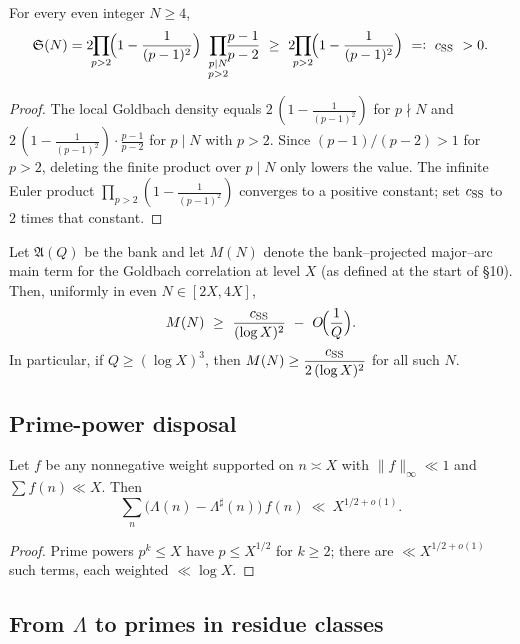 \begin{lemma}\label{lem:SS-positive}
For every even integer $N\ge 4$,
\[
\mathfrak S(N)
=2\!\!\prod_{p>2}\!\!\Big(1-\frac{1}{(p-1)^2}\Big)\ \prod_{\substack{p\mid N\\ p>2}}\!\!\frac{p-1}{p-2}
\ \ge\ 2\!\!\prod_{p>2}\!\!\Big(1-\frac{1}{(p-1)^2}\Big)\ =:\ c_{\rm SS}\ >0.
\]
\end{lemma}

\begin{proof}
The local Goldbach density equals $2\,(1-\tfrac{1}{(p-1)^2})$ for $p\nmid N$ and $2\,(1-\tfrac{1}{(p-1)^2})\cdot \frac{p-1}{p-2}$ for $p\mid N$ with $p>2$. Since $(p-1)/(p-2)>1$ for $p>2$, deleting the finite product over $p\mid N$ only lowers the value. The infinite Euler product $\prod_{p>2}(1-\frac{1}{(p-1)^2})$ converges to a positive constant; set $c_{\rm SS}$ to $2$ times that constant.
\end{proof}

\begin{corollary}\label{cor:bank-main}
Let $\mathfrak A(Q)$ be the bank and let $M(N)$ denote the bank–projected major–arc main term for the Goldbach correlation at level $X$ (as defined at the start of §10). Then, uniformly in even $N\in[2X,4X]$,
\[
M(N)\ \ge\ \frac{c_{\rm SS}}{(\log X)^2}\ -\ O\!\Big(\frac{1}{Q}\Big).
\]
In particular, if $Q\ge (\log X)^3$, then $M(N)\ge \dfrac{c_{\rm SS}}{2\,(\log X)^2}$ for all such $N$.
\end{corollary}

\subsection{Prime-power disposal}

\begin{lemma}\label{lem:pp}
Let $f$ be any nonnegative weight supported on $n\asymp X$ with $\|f\|_\infty\ll 1$ and $\sum f(n)\ll X$. Then
\[
\sum_{n} \big(\Lambda(n)-\Lambda^\sharp(n)\big)\, f(n)\ \ll\ X^{1/2+o(1)}.
\]
\end{lemma}

\begin{proof}
Prime powers $p^k\le X$ have $p\le X^{1/2}$ for $k\ge 2$; there are $\ll X^{1/2+o(1)}$ such terms, each weighted $\ll \log X$.
\end{proof}

\subsection{From \texorpdfstring{$\Lambda$}{Lambda} to primes in residue classes}

